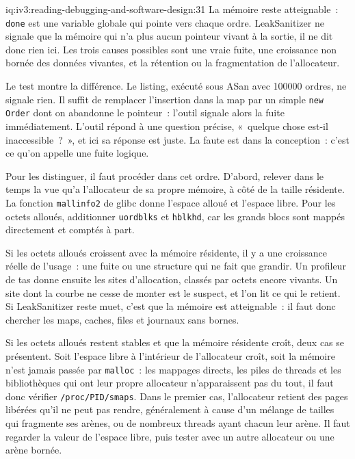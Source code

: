 \begin{solution}{iq:iv3:reading-debugging-and-software-design:31}
La mémoire reste atteignable~: \texttt{done} est une variable globale qui pointe vers chaque ordre. LeakSanitizer ne signale que la mémoire qui n'a plus aucun pointeur vivant à la sortie, il ne dit donc rien ici. Les trois causes possibles sont une vraie fuite, une croissance non bornée des données vivantes, et la rétention ou la fragmentation de l'allocateur.

Le test montre la différence. Le listing, exécuté sous ASan avec 100000 ordres, ne signale rien. Il suffit de remplacer l'insertion dans la map par un simple \texttt{new Order} dont on abandonne le pointeur~: l'outil signale alors la fuite immédiatement. L'outil répond à une question précise, «~quelque chose est-il inaccessible~?~», et ici sa réponse est juste. La faute est dans la conception~: c'est ce qu'on appelle une fuite logique.

Pour les distinguer, il faut procéder dans cet ordre. D'abord, relever dans le temps la vue qu'a l'allocateur de sa propre mémoire, à côté de la taille résidente. La fonction \texttt{mallinfo2} de glibc donne l'espace alloué et l'espace libre. Pour les octets alloués, additionner \texttt{uordblks} et \texttt{hblkhd}, car les grands blocs sont mappés directement et comptés à part.

Si les octets alloués croissent avec la mémoire résidente, il y a une croissance réelle de l'usage~: une fuite ou une structure qui ne fait que grandir. Un profileur de tas donne ensuite les sites d'allocation, classés par octets encore vivants. Un site dont la courbe ne cesse de monter est le suspect, et l'on lit ce qui le retient. Si LeakSanitizer reste muet, c'est que la mémoire est atteignable~: il faut donc chercher les maps, caches, files et journaux sans bornes.

Si les octets alloués restent stables et que la mémoire résidente croît, deux cas se présentent. Soit l'espace libre à l'intérieur de l'allocateur croît, soit la mémoire n'est jamais passée par \texttt{malloc}~: les mappages directs, les piles de threads et les bibliothèques qui ont leur propre allocateur n'apparaissent pas du tout, il faut donc vérifier \texttt{/proc/PID/smaps}. Dans le premier cas, l'allocateur retient des pages libérées qu'il ne peut pas rendre, généralement à cause d'un mélange de tailles qui fragmente ses arènes, ou de nombreux threads ayant chacun leur arène. Il faut regarder la valeur de l'espace libre, puis tester avec un autre allocateur ou une arène bornée.


\end{solution}
